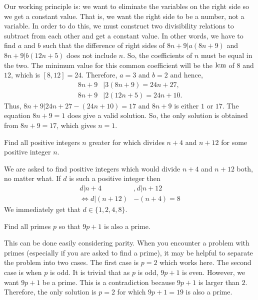 \documentclass{subfile}
\begin{document}
		\begin{solution}
			Our working principle is: we want to eliminate the variables on the right side so we get a constant value. That is, we want the right side to be a number, not a variable. In order to do this, we must construct two divisibility relations to subtract from each other and get a constant value. In other words, we have to find $a$ and $b$ such that the difference of right sides of $8n+9|a(8n+9)$ and $8n+9|b(12n+5)$ does not include $n$. So, the coefficients of $n$ must be equal in the two. The minimum value for this common coefficient will be the $\operatorname{lcm}$ of $8$ and $12$, which is $[8,12]=24$. Therefore, $a=3$ and $b=2$ and hence,
				\begin{align*}
					8n+9 & |3(8n+9) =24n+27,\\
					8n+9 & |2(12n+5) =24n+10.
				\end{align*}
			Thus, $8n+9|24n+27-(24n+10)=17$ and $8n+9$ is either $1$ or $17$. The equation $8n+9=1$ does give a valid solution. So, the only solution is obtained from $8n+9=17$, which gives $n=1$.
		\end{solution}

		\begin{problem}
			Find all positive integers $n$ greater for which divides $n+4$ and $n+12$ for some positive integer $n$.
		\end{problem}

		\begin{solution}
			We are asked to find positive integers which would divide $n+4$ and $n+12$ both, no matter what. If $d$ is such a positive integer then
				\begin{align*}
					d|n+4 & , d|n+12\\
					\iff d|(n+12)&-(n+4)=8
				\end{align*}
			We immediately get that $d\in\{1,2,4,8\}$.
		\end{solution}

		\begin{problem}
			Find all primes $p$ so that $9p+1$ is also a prime.
		\end{problem}

		\begin{solution}
			This can be done easily considering parity. When you encounter a problem with primes (especially if you are asked to find a prime), it may be helpful to separate the problem into two cases. The first case is $p=2$ which works here. The second case is when $p$ is odd. It is trivial that as $p$ is odd, $9p+1$ is even. However, we want $9p+1$ be a prime. This is a contradiction because $9p+1$ is larger than $2$. Therefore, the only solution is $p=2$ for which $9p+1=19$ is also a prime.
		\end{solution}
\end{document}
